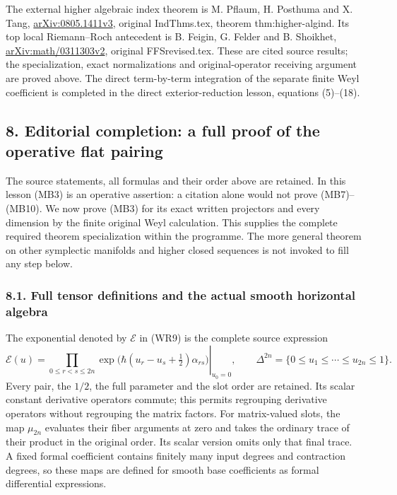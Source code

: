 \documentclass[
  11pt,
]{article}
\begin{document}
The external higher algebraic index theorem is M. Pflaum, H. Posthuma
and X. Tang, \href{https://arxiv.org/abs/0805.1411}{arXiv:0805.1411v3},
original IndThms.tex, theorem thm:higher-algind. Its top local
Riemann--Roch antecedent is B. Feigin, G. Felder and B. Shoikhet,
\href{https://arxiv.org/abs/math/0311303}{arXiv:math/0311303v2},
original FFSrevised.tex. These are cited source results; the
specialization, exact normalizations and original-operator receiving
argument are proved above. The direct term-by-term integration of the
separate finite Weyl coefficient is completed in the direct
exterior-reduction lesson, equations (5)--(18).

\subsection{8. Editorial completion: a full proof of the operative flat
pairing}\label{editorial-completion-a-full-proof-of-the-operative-flat-pairing}

The source statements, all formulas and their order above are retained.
In this lesson (MB3) is an operative assertion: a citation alone would
not prove (MB7)--(MB10). We now prove (MB3) for its exact written
projectors and every dimension by the finite original Weyl calculation.
This supplies the complete required theorem specialization within the
programme. The more general theorem on other symplectic manifolds and
higher closed sequences is not invoked to fill any step below.

\subsubsection{8.1. Full tensor definitions and the actual smooth
horizontal
algebra}\label{full-tensor-definitions-and-the-actual-smooth-horizontal-algebra}

The exponential denoted by \(\mathcal E\) in (WR9) is the complete
source expression \[
 \mathcal E(u)=
 \left.\prod_{0\le r<s\le2n}
       \exp\bigl(\hbar(u_r-u_s+\tfrac12)\alpha_{rs}\bigr)
                  \right|_{u_0=0},\qquad
 \Delta^{2n}=\{0\le u_1\le\cdots\le u_{2n}\le1\}.
 \tag{LP1}
\] Every pair, the \(1/2\), the full parameter and the slot order are
retained. Its scalar constant derivative operators commute; this permits
regrouping derivative operators without regrouping the matrix factors.
For matrix-valued slots, the map \(\mu_{2n}\) evaluates their fiber
arguments at zero and takes the ordinary trace of their product in the
original order. Its scalar version omits only that final trace. A fixed
formal coefficient contains finitely many input degrees and contraction
degrees, so these maps are defined for smooth base coefficients as
formal differential expressions.
\end{document}
